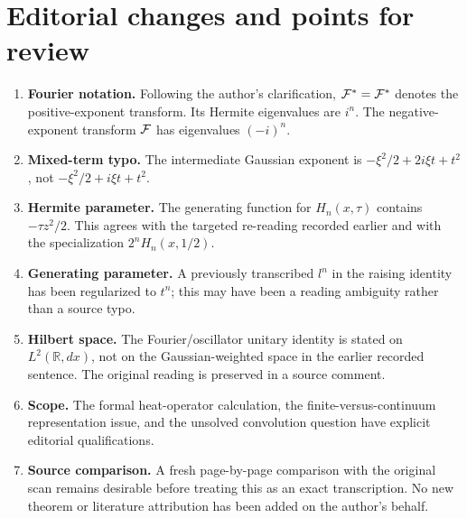 \documentclass[11pt]{amsart}
\newcommand{\RR}{\mathbb R}
\newcommand{\F}{{\cal F}}
\newcommand{\Fstar}{{\cal F}^{*}}
\begin{document}
\section{Editorial changes and points for review}
\begin{enumerate}
\item \textbf{Fourier notation.} Following the author's clarification,
$\Fstar={\cal F}^{*}$ denotes the positive-exponent transform.
Its Hermite eigenvalues are $i^n$. The negative-exponent transform
$\F$ has eigenvalues $(-i)^n$.
\item \textbf{Mixed-term typo.} The intermediate Gaussian exponent
is $-\xi^2/2+2i\xi t+t^2$, not
$-\xi^2/2+i\xi t+t^2$.
\item \textbf{Hermite parameter.} The generating function for
$H_n(x,\tau)$ contains $-\tau z^2/2$. This agrees with the targeted
re-reading recorded earlier and with the specialization
$2^nH_n(x,1/2)$.
\item \textbf{Generating parameter.} A previously transcribed $l^n$
in the raising identity has been regularized to $t^n$; this may have
been a reading ambiguity rather than a source typo.
\item \textbf{Hilbert space.} The Fourier/oscillator unitary identity
is stated on $L^2(\RR,dx)$, not on the Gaussian-weighted space in
the earlier recorded sentence. The original reading is preserved
in a source comment.
\item \textbf{Scope.} The formal heat-operator calculation, the
finite-versus-continuum representation issue, and the unsolved
convolution question have explicit editorial qualifications.
\item \textbf{Source comparison.} A fresh page-by-page comparison
with the original scan remains desirable before treating this as
an exact transcription. No new theorem or literature attribution
has been added on the author's behalf.
\end{enumerate}
\end{document}
